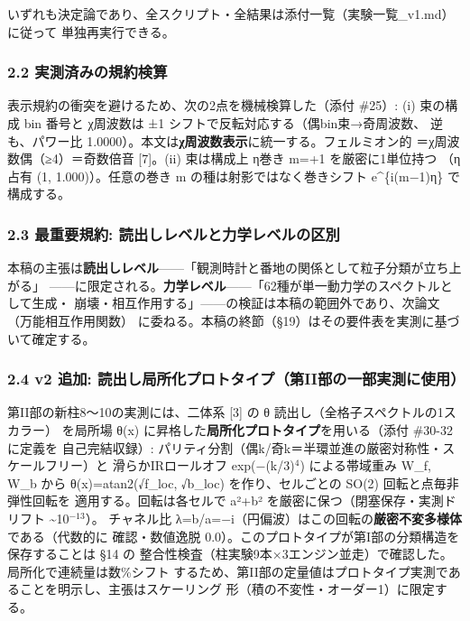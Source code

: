 \documentclass[
]{ltjarticle}
\begin{document}
いずれも決定論であり、全スクリプト・全結果は添付一覧（実験一覧\_v1.md）に従って
単独再実行できる。

\subsubsection{2.2
実測済みの規約検算}\label{ux5b9fux6e2cux6e08ux307fux306eux898fux7d04ux691cux7b97}

表示規約の衝突を避けるため、次の2点を機械検算した（添付 \#25）: (i)
束の構成 bin 番号と χ周波数は ±1
シフトで反転対応する（偶bin束→奇周波数、 逆も、パワー比
1.0000）。本文は\textbf{χ周波数表示}に統一する。フェルミオン的
＝χ周波数偶（≥4）＝奇数倍音 {[}7{]}。(ii) 束は構成上 η巻き m=+1
を厳密に1単位持つ （η占有 (1, 1.000)）。任意の巻き m
の種は射影ではなく巻きシフト e\^{}\{i(m−1)η\} で 構成する。

\subsubsection{2.3 最重要規約:
読出しレベルと力学レベルの区別}\label{ux6700ux91cdux8981ux898fux7d04-ux8aadux51faux3057ux30ecux30d9ux30ebux3068ux529bux5b66ux30ecux30d9ux30ebux306eux533aux5225}

本稿の主張は\textbf{読出しレベル}------「観測時計と番地の関係として粒子分類が立ち上がる」
------に限定される。\textbf{力学レベル}------「62種が単一動力学のスペクトルとして生成・
崩壊・相互作用する」------の検証は本稿の範囲外であり、次論文（万能相互作用関数）
に委ねる。本稿の終節（§19）はその要件表を実測に基づいて確定する。

\subsubsection{2.4 v2 追加:
読出し局所化プロトタイプ（第II部の一部実測に使用）}\label{v2-ux8ffdux52a0-ux8aadux51faux3057ux5c40ux6240ux5316ux30d7ux30edux30c8ux30bfux30a4ux30d7ux7b2ciiux90e8ux306eux4e00ux90e8ux5b9fux6e2cux306bux4f7fux7528}

第II部の新柱8〜10の実測には、二体系 {[}3{]} の θ
読出し（全格子スペクトルの1スカラー） を局所場 θ(x)
に昇格した\textbf{局所化プロトタイプ}を用いる（添付 \#30-32 に定義を
自己完結収録）:
パリティ分割（偶k/奇k＝半環並進の厳密対称性・スケールフリー）と
滑らかIRロールオフ exp(−(\textbar k\textbar/3)\(^{4}\)) による帯域重み
W\_f, W\_b から θ(x)=atan2(√f\_loc, √b\_loc) を作り、セルごとの SO(2)
回転と点毎非弾性回転を 適用する。回転は各セルで
\textbar a\textbar²+\textbar b\textbar²
を厳密に保つ（閉塞保存・実測ドリフト \textasciitilde10\(^{-13}\)）。
チャネル比
λ=b/a=−i（円偏波）はこの回転の\textbf{厳密不変多様体}である（代数的に
確認・数値逸脱 0.0）。このプロトタイプが第I部の分類構造を保存することは
§14 の
整合性検査（柱実験9本×3エンジン並走）で確認した。局所化で連続量は数\%シフト
するため、第II部の定量値はプロトタイプ実測であることを明示し、主張はスケーリング
形（積の不変性・オーダー1）に限定する。
\end{document}
